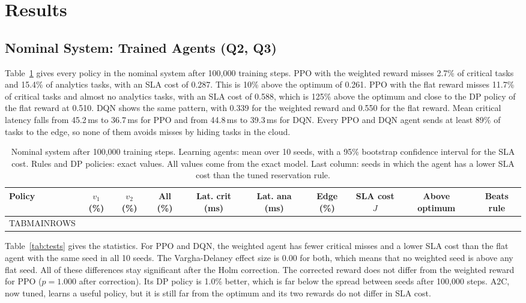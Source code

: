 \section{Results}
\label{sec:results}

\subsection{Nominal System: Trained Agents (Q2, Q3)}
Table~\ref{tab:main} gives every policy in the nominal system after 100,000 training steps. PPO with the weighted reward misses 2.7\% of critical tasks and 15.4\% of analytics tasks, with an SLA cost of 0.287. This is 10\% above the optimum of 0.261. PPO with the flat reward misses 11.7\% of critical tasks and almost no analytics tasks, with an SLA cost of 0.588, which is 125\% above the optimum and close to the DP policy of the flat reward at 0.510. DQN shows the same pattern, with 0.339 for the weighted reward and 0.550 for the flat reward. Mean critical latency falls from 45.2\,ms to 36.7\,ms for PPO and from 44.8\,ms to 39.3\,ms for DQN. Every PPO and DQN agent sends at least 89\% of tasks to the edge, so none of them avoids misses by hiding tasks in the cloud.

\begin{table}[t]
\caption{Nominal system after 100,000 training steps. Learning agents: mean over 10 seeds, with a 95\% bootstrap confidence interval for the SLA cost. Rules and DP policies: exact values. All values come from the exact model. Last column: seeds in which the agent has a lower SLA cost than the tuned reservation rule.}
\label{tab:main}
\centering
\footnotesize
\setlength{\tabcolsep}{3.2pt}
\begin{tabular}{@{}lccccccccc@{}}
\toprule
Policy & $v_1$ (\%) & $v_2$ (\%) & All (\%) & Lat. crit (ms) & Lat. ana (ms) & Edge (\%) & SLA cost $J$ & Above optimum & Beats rule \\
\midrule
TABMAINROWS
\bottomrule
\end{tabular}
\end{table}

Table~\ref{tab:tests} gives the statistics. For PPO and DQN, the weighted agent has fewer critical misses and a lower SLA cost than the flat agent with the same seed in all 10 seeds. The Vargha-Delaney effect size is 0.00 for both, which means that no weighted seed is above any flat seed. All of these differences stay significant after the Holm correction. The corrected reward does not differ from the weighted reward for PPO ($p=1.000$ after correction). Its DP policy is 1.0\% better, which is far below the spread between seeds after 100,000 steps. A2C, now tuned, learns a useful policy, but it is still far from the optimum and its two rewards do not differ in SLA cost.

